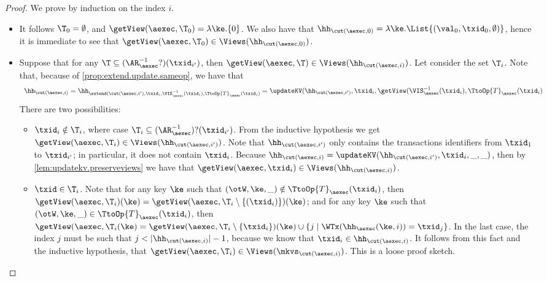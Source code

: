 \begin{proof}
We prove by induction on the index $i$. 
\begin{itemize}
\item {} It follows $\T_{0} = \emptyset$, and $\getView(\aexec, \T_{0}) = \lambda \ke. \{0 \}$. 
We also have that $\hh_{\cut(\aexec, 0)} = \lambda \ke. \List{(\val_0, \txid_{0}, \emptyset)}$, hence 
it is immediate to see that $\getView(\aexec, \T_{0}) \in \Views(\hh_{\cut(\aexec, 0)})$.

\item {}
Suppose that for any $\T \subseteq (\AR_{\aexec}^{-1}?)(\txid_{i'})$, 
then $\getView(\aexec, \T) \in \Views(\hh_{\cut(\aexec, i)})$. 
Let consider the set $\T_{i}$.
Note that, because of \cref{prop:extend.update.sameop}, we have that
\[
\begin{array}{l}
\hh_{\cut(\aexec, i)} =
\hh_{\extend(\cut(\aexec, i'), \txid_{i}, \VIS^{-1}_{\aexec}(\txid_{i}), \TtoOp{T}_{\aexec}(\txid_{i})} 
= \updateKV(\hh_{\cut(\aexec, i')}, \txid_{i}, \getView(\VIS^{-1}_{\aexec}(\txid_{i}), \TtoOp{T}_{\aexec}(\txid_{i})
\end{array}
\]
There are two possibilities:
\begin{itemize}
\item $\txid_{i} \notin \T_{i}$, where case $\T_{i} \subseteq (\AR_{\aexec}^{-1})?(\txid_{i'})$.
From the inductive hypothesis we get $\getView(\aexec, \T_{i}) \in \Views(\hh_{\cut(\aexec, i')})$. 
Note that $\hh_{\cut(\aexec, i')}$ only contains the transactions identifiers from $\txid_{1}$ to $\txid_{i'}$;
in particular, it does not contain $\txid_{i}$. 
Because $\hh_{\cut(\aexec, i)} = \updateKV(\hh_{\cut(\aexec, i')}, \txid_{i}, \_, \_)$, 
then by \cref{lem:updatekv.preserveviews} we have that $\getView(\aexec, \txid_{i}) \in \Views(\hh_{\cut(\aexec, i)})$.

\item $\txid \in \T_{i}$. Note that for any key $\ke$ such that 
$(\otW, \ke, \_) \notin \TtoOp{T}_{\aexec}(\txid_{i})$, then 
$\getView(\aexec, \T_{i})(\ke) = \getView(\aexec, \T_{i} \setminus \{(\txid_{i})\})(\ke)$; 
and for any key $\ke$ such that $(\otW, \ke, \_) \in \TtoOp{T}_{\aexec}(\txid_{i})$, 
then $\getView(\aexec, \T_{i}(\ke) = \getView(\aexec, \T_{i} \setminus \{\txid_{i}\})(\ke) 
\cup \{j \mid \WTx(\hh_{\aexec}(\ke, i)) = \txid_{j}\}$. 
In the last case, the index $j$ must be such that $j < \lvert \hh_{\cut(\aexec, i)} \rvert - 1$, 
because we know that $\txid_{i} \in \hh_{\cut(\aexec, i)}$. 
It follows from this fact and the inductive hypothesis, 
that $\getView(\aexec, \T_{i}) \in \Views(\mkvs_{\cut(\aexec, i)})$.
\ac{This is a loose proof sketch.} 
\end{itemize}
\end{itemize}
\end{proof}

